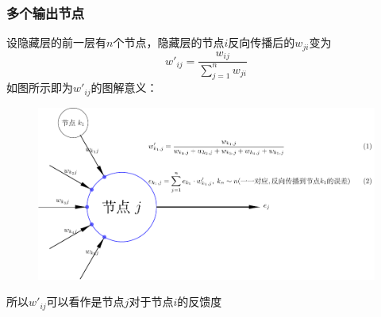 \documentclass[12pt]{article}
\begin{document}
    \subsubsection{多个输出节点}
    设隐藏层的前一层有$n$个节点，隐藏层的节点$i$反向传播后的$w_{ji}$变为
    \begin{equation}
        w'_{ij}=\frac{w_{ij}}{\sum_{j=1}^{n}{w_{ji}}}
    \end{equation}
    如图所示即为$w'_{ij}$的图解意义：
    \begin{figure}[!htb]
        \centering
        \includegraphics[scale=0.5]{picture/InverseBoardCast.pdf}
    \end{figure}
    所以$w'_{ij}$可以看作是节点$j$对于节点$i$的反馈度
\end{document}
